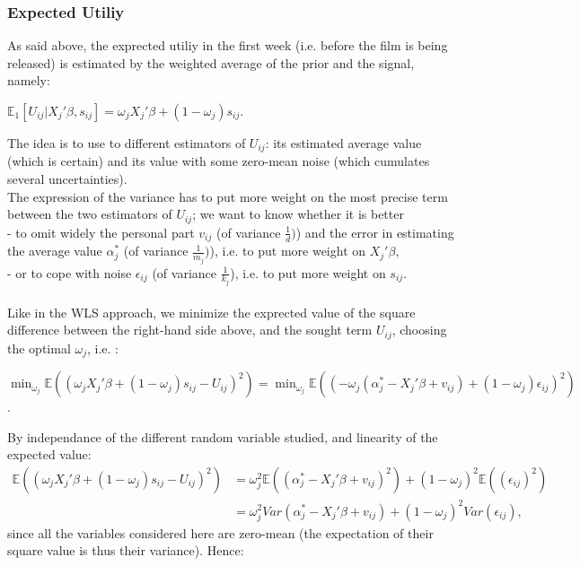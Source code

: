 	\subsubsection{Expected Utiliy}
	As said above, the exprected utiliy in the first week (i.e. before the film is being released) is estimated by the weighted average of the prior and the signal, namely:
	\begin{center}
		$\mathbb{E}_1[U_{i j}|X_{j}'\beta, s_{i j}]=\omega_{j} X_{j}'\beta+(1-\omega_{j})s_{i j}$.
	\end{center}
	The idea is to use to different estimators of $U_{i j}$: its estimated average value (which is certain) and its value with some zero-mean noise (which cumulates several uncertainties).\\
	The expression of the variance has to put more weight on the most precise term between the two estimators of $U_{i j}$; we want to know whether it is better \\
	- to omit widely the personal part $v_{i j}$ (of variance $\frac{1}{d})$) and the error in estimating the average value $\alpha_{j}^{*}$ (of variance $\frac{1}{m_{j}})$), i.e. to put more weight on $X_{j}'\beta$,\\
	- or to cope with noise $\epsilon_{i j}$ (of variance $\frac{1}{k_{j}}$), i.e. to put more weight on $s_{i j}$.\\
	\\
	Like in the WLS approach, we minimize the exprected value of the square difference between the right-hand side above, and the sought term $U_{i j}$, choosing the optimal $\omega_{j}$, i.e. :
	\begin{center}
		$\min_{\omega_{j}} \mathbb{E}((\omega_{j} X_{j}'\beta+(1-\omega_{j})s_{i j}-U_{i j})^{2})=\min_{\omega_{j}} \mathbb{E}((-\omega_{j} (\alpha_{j}^{*}-X_{j}'\beta+v_{i j})+(1-\omega_{j})\epsilon_{i j})^{2})$.
	\end{center}
	By independance of the different random variable studied, and linearity of the expected value:
	\begin{align*}
	\mathbb{E}((\omega_{j} X_{j}'\beta+(1-\omega_{j})s_{i j}-U_{i j})^2)&=\omega_{j}^{2}\mathbb{E}((\alpha_{j}^{*}-X_{j}'\beta+v_{i j})^{2})+(1-\omega_{j})^{2}\mathbb{E}((\epsilon_{i j})^{2})\\
	&=\omega_{j}^{2}Var(\alpha_{j}^{*}-X_{j}'\beta+v_{i j})+(1-\omega_{j})^{2}Var(\epsilon_{i j}),
	\end{align*}
	since all the variables considered here are zero-mean (the expectation of their square value is thus their variance). Hence:
